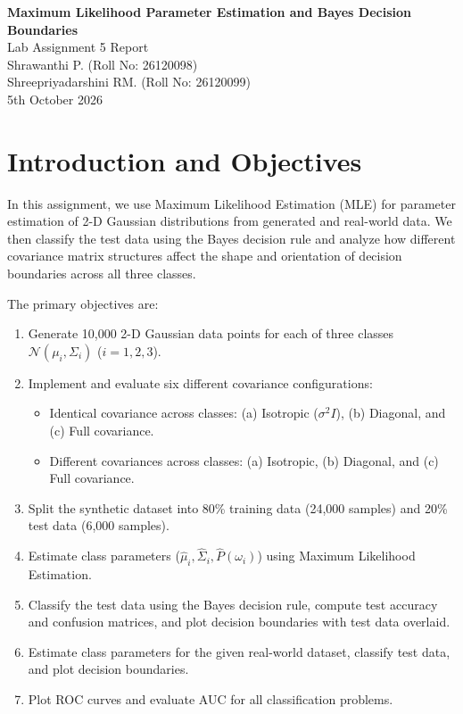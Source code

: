 \documentclass[11pt,a4paper]{article}
\begin{document}
\begin{center}
{\LARGE \textbf{Maximum Likelihood Parameter Estimation and Bayes Decision Boundaries}}\\[8pt]
{\large Lab Assignment 5 Report}\\[8pt]
Shrawanthi P. (Roll No: 26120098)\\
Shreepriyadarshini RM. (Roll No: 26120099)\\[4pt]
5th October 2026
\end{center}

\section{Introduction and Objectives}
In this assignment, we use Maximum Likelihood Estimation (MLE) for parameter estimation of 2-D Gaussian distributions from generated and real-world data. We then classify the test data using the Bayes decision rule and analyze how different covariance matrix structures affect the shape and orientation of decision boundaries across all three classes.

The primary objectives are:
\begin{enumerate}
  \item Generate 10,000 2-D Gaussian data points for each of three classes $\mathcal{N}(\mu_i,\Sigma_i)$ ($i=1,2,3$).
  \item Implement and evaluate six different covariance configurations:
  \begin{itemize}
    \item Identical covariance across classes: (a) Isotropic ($\sigma^2 I$), (b) Diagonal, and (c) Full covariance.
    \item Different covariances across classes: (a) Isotropic, (b) Diagonal, and (c) Full covariance.
  \end{itemize}
  \item Split the synthetic dataset into 80\% training data (24,000 samples) and 20\% test data (6,000 samples).
  \item Estimate class parameters ($\hat{\mu}_i, \hat{\Sigma}_i, \hat{P}(\omega_i)$) using Maximum Likelihood Estimation.
  \item Classify the test data using the Bayes decision rule, compute test accuracy and confusion matrices, and plot decision boundaries with test data overlaid.
  \item Estimate class parameters for the given real-world dataset, classify test data, and plot decision boundaries.
  \item Plot ROC curves and evaluate AUC for all classification problems.
\end{enumerate}
\end{document}

